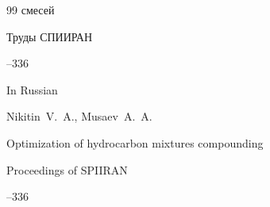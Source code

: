 \begin{thebibliography}{99}
смесей

\jour Труды СПИИРАН



--336

\misctransl

\lang In Russian

\by Nikitin~V.~A., Musaev~A.~A.

\paper Optimization of hydrocarbon mixtures compounding

\jour Proceedings of SPIIRAN



--336





\end{thebibliography}






\makeentitle







%



